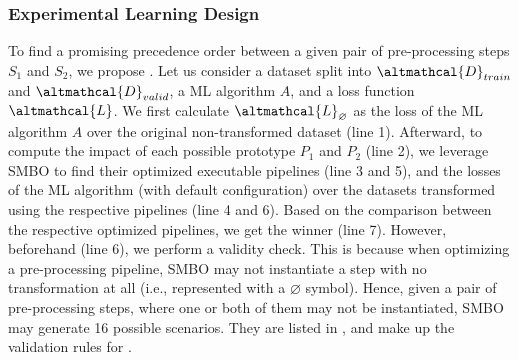 \subsubsection{Experimental Learning Design}
To find a promising precedence order between a given pair of pre-processing steps $S_1$ and $S_2$, we propose .
Let us consider a dataset split into $\altmathcal{D}_{train}$ and $\altmathcal{D}_{valid}$, a ML algorithm $A$, and a loss function $\altmathcal{L}$.
We first calculate $\altmathcal{L}_{\varnothing}$ as the loss of the ML algorithm $A$ over the original non-transformed dataset (line 1).
Afterward, to compute the impact of each possible prototype $P_1$ and $P_2$ (line 2), we leverage SMBO to find their optimized executable pipelines (line 3 and 5), and the losses of the ML algorithm (with default configuration) over the datasets transformed using the respective pipelines (line 4 and 6).
Based on the comparison between the respective optimized pipelines, we get the winner (line 7).
However, beforehand (line 6), we perform a validity check.
This is because when optimizing a pre-processing pipeline, SMBO may not instantiate a step with no transformation at all (i.e., represented with a $\varnothing$ symbol).
Hence, given a pair of pre-processing steps, where one or both of them may not be instantiated, SMBO may generate 16 possible scenarios.
They are listed in , and make up the validation rules for .

